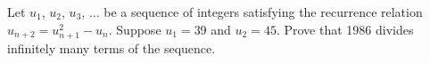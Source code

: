 Let $u_1$,  $u_2$,  $u_3$,  $\dots$ be a sequence of integers satisfying the recurrence relation $u_{n + 2} = u_{n + 1}^2 - u_n$.  Suppose $u_1 = 39$ and $u_2 = 45$.  Prove that 1986 divides infinitely many terms of the sequence.